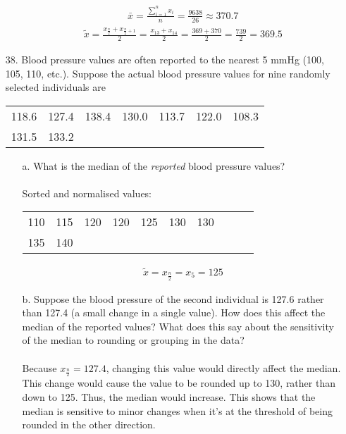 \documentclass[letterpaper,12pt]{article}
\begin{document}
\begin{enumerate}
\begin{enumerate}
\begin{align*}
          \bar{x} = \frac{\sum_{i=1}^{n} x_{i}}{n} = \frac{9638}{26} \approx 370.7
        \end{align*}
        \begin{align*}
          \tilde{x} = \frac{x_{\frac{n}{2}} + x_{\frac{n}{2} + 1}}{2} = \frac{x_{13} + x_{14}}{2} = \frac{369 + 370}{2} = \frac{739}{2} = 369.5
        \end{align*}
    \end{enumerate}
  \item[38.]
    Blood pressure values are often reported to the nearest 5 mmHg (100, 105, 110, etc.). Suppose the actual blood pressure values for nine randomly selected individuals are
    \begin{center}
      \begin{tabular}{ccccccc}
        118.6 & 127.4 & 138.4 & 130.0 & 113.7 & 122.0 & 108.3 \\
        131.5 & 133.2
      \end{tabular}
    \end{center}
    \begin{enumerate}
      \item[a.]
        What is the median of the \textit{reported} blood pressure values?
        \\ \\
        Sorted and normalised values:
        \begin{center}
          \begin{tabular}{cccccccccc}
            110 & 115 & 120 & 120 & 125 & 130 & 130 \\
            135 & 140
          \end{tabular}
        \end{center}
        \begin{align*}
          \tilde{x} = x_{\frac{n}{2}} = x_{5} = 125
        \end{align*}
      \item[b.]
        Suppose the blood pressure of the second individual is 127.6 rather than 127.4 (a small change in a single value). How does this affect the median of the reported values? What does this say about the sensitivity of the median to rounding or grouping in the data?
        \\ \\
        Because $x_{\frac{n}{2}} = 127.4$, changing this value would directly affect the median. This change would cause the value to be rounded up to 130, rather than down to 125. Thus, the median would increase. This shows that the median is sensitive to minor changes when it's at the threshold of being rounded in the other direction.

\end{enumerate}
\end{enumerate}
\end{document}
